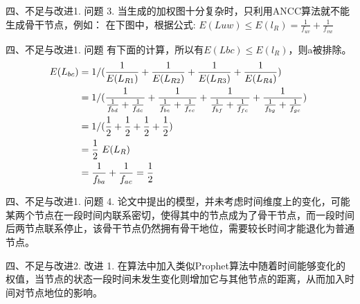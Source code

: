 \documentclass[12pt,aspectratio=43,table]{beamer}
\begin{document}
\begin{frame}{四、不足与改进}{1. 问题}
3. 当生成的加权图十分复杂时，只利用ANCC算法就不能生成骨干节点，例如：
在下图中，根据公式: $E(L{uw})\le E(l_R)=\frac{1}{f_{uv}}+\frac{1}{f_{vw}}$
\begin{figure}  
\end{figure}


\end{frame}

\begin{frame}{ 四、不足与改进}{1. 问题}
有下面的计算，所以有$E(L{bc})\le E(l_R)$，则a被排除。
\begin{equation}
$$\begin{align} E(L_{bc})&=1/(\frac{1}{E(L_{R1})}+\frac{1}{E(L_{R2})}+\frac{1}{E(L_{R3})}+\frac{1}{E(L_{R4})})\  \\ &=1/(\frac{1}{\frac{1}{f_{bd}}+\frac{1}{f_{dc}}} + \frac{1}{\frac{1}{f_{be}}+\frac{1}{f_{ec}}} + \frac{1}{\frac{1}{f_{bf}}+\frac{1}{f_{fc}}} + \frac{1}{\frac{1}{f_{bg}}+\frac{1}{f_{gc}}})\  \nonumber \\
&=1/(\frac{1}{2} + \frac{1}{2} + \frac{1}{2} + \frac{1}{2})\    \nonumber \\
&=\frac{1}{2}\ E(L_R)\ \nonumber \\
&=\frac{1}{f_{ba}} + \frac{1}{f_{ac}} \nonumber
=\frac{1}{2}   \nonumber
\end{align} $$
\end{equation}
\end{frame}

\begin{frame}{四、不足与改进}{1. 问题}
4. 论文中提出的模型，并未考虑时间维度上的变化，可能某两个节点在一段时间内联系密切，使得其中的节点成为了骨干节点，而一段时间后两节点联系停止，该骨干节点仍然拥有骨干地位，需要较长时间才能退化为普通节点。
\end{frame}

\begin{frame}{ 四、不足与改进}{2. 改进}
1. 在算法中加入类似Prophet算法中随着时间能够变化的权值，当节点的状态一段时间未发生变化则增加它与其他节点的距离，从而加入时间对节点地位的影响。
\end{frame}
\end{document}

